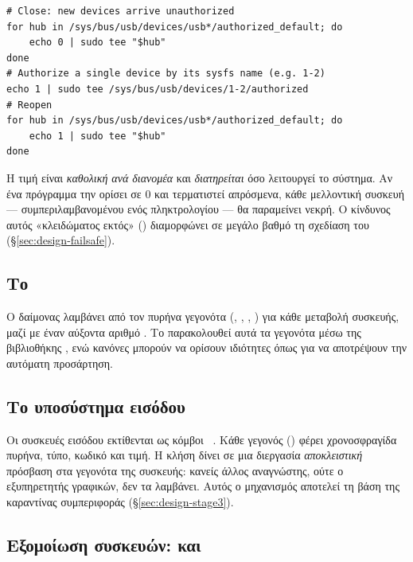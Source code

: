 \begin{lstlisting}[language=shell,caption={Χειροκίνητο «κλείσιμο» και άνοιγμα της πύλης μέσω \en{sysfs}.},label=lst:sysfs-manual]
# Close: new devices arrive unauthorized
for hub in /sys/bus/usb/devices/usb*/authorized_default; do
    echo 0 | sudo tee "$hub"
done
# Authorize a single device by its sysfs name (e.g. 1-2)
echo 1 | sudo tee /sys/bus/usb/devices/1-2/authorized
# Reopen
for hub in /sys/bus/usb/devices/usb*/authorized_default; do
    echo 1 | sudo tee "$hub"
done
\end{lstlisting}

Η τιμή  είναι \emph{καθολική ανά διανομέα} και
\emph{διατηρείται} όσο λειτουργεί το σύστημα. Αν ένα πρόγραμμα την ορίσει σε 0
και τερματιστεί απρόσμενα, κάθε μελλοντική συσκευή — συμπεριλαμβανομένου ενός
πληκτρολογίου  — θα παραμείνει νεκρή. Ο κίνδυνος αυτός «κλειδώματος
εκτός» () διαμορφώνει σε μεγάλο βαθμό τη σχεδίαση του \Probolos{}
(§\ref{sec:design-failsafe}).

\subsection{Το }

Ο δαίμονας  λαμβάνει από τον πυρήνα γεγονότα  (,
, , ) για κάθε μεταβολή συσκευής, μαζί με
έναν αύξοντα αριθμό . Το \Probolos{} παρακολουθεί αυτά τα γεγονότα
μέσω της βιβλιοθήκης , ενώ κανόνες  μπορούν να ορίσουν
ιδιότητες όπως  για να αποτρέψουν την αυτόματη προσάρτηση.

\subsection{Το υποσύστημα εισόδου }

Οι συσκευές εισόδου εκτίθενται ως κόμβοι ~\cite{kernel-input}.
Κάθε γεγονός () φέρει χρονοσφραγίδα πυρήνα, τύπο,
κωδικό και τιμή. Η κλήση  δίνει σε μια διεργασία
\emph{αποκλειστική} πρόσβαση στα γεγονότα της συσκευής: κανείς άλλος αναγνώστης,
ούτε ο εξυπηρετητής γραφικών, δεν τα λαμβάνει. Αυτός ο μηχανισμός αποτελεί τη
βάση της καραντίνας συμπεριφοράς (§\ref{sec:design-stage3}).

\subsection{Εξομοίωση συσκευών:  και }

